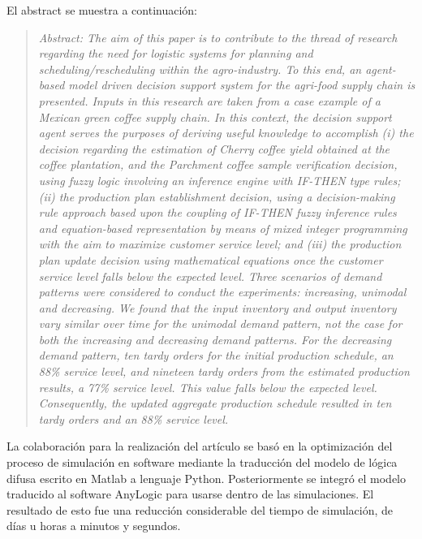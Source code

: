 El abstract se muestra a continuación:

\begin{quotation}
\emph{Abstract: The aim of this paper is to contribute to the thread of research
regarding the need for logistic systems for planning and scheduling/rescheduling
within the agro-industry. To this end, an agent-based model driven decision
support system for the agri-food supply chain is presented. Inputs in this
research are taken from a case example of a Mexican green coffee supply chain.
In this context, the decision support agent serves the purposes of deriving
useful knowledge to accomplish (i) the decision regarding the estimation of
Cherry coffee yield obtained at the coffee plantation, and the Parchment coffee
sample verification decision, using fuzzy logic involving an inference engine
with IF-THEN type rules; (ii) the production plan establishment decision, using
a decision-making rule approach based upon the coupling of IF-THEN fuzzy
inference rules and equation-based representation by means of mixed integer
programming with the aim to maximize customer service level; and (iii) the
production plan update decision using mathematical equations once the customer
service level falls below the expected level. Three scenarios of demand patterns
were considered to conduct the experiments: increasing, unimodal and decreasing.
We found that the input inventory and output inventory vary similar over time
for the unimodal demand pattern, not the case for both the increasing and
decreasing demand patterns. For the decreasing demand pattern, ten tardy orders
for the initial production schedule, an 88\% service level, and nineteen tardy
orders from the estimated production results, a 77\% service level. This value
falls below the expected level. Consequently, the updated aggregate production
schedule resulted in ten tardy orders and an 88\% service level.}
\end{quotation}

La colaboración para la realización del artículo se basó en la optimización del
proceso de simulación en software mediante la traducción del modelo de lógica
difusa escrito en Matlab a lenguaje Python. Posteriormente se integró el modelo
traducido al software AnyLogic para usarse dentro de las
simulaciones. El resultado de esto fue una reducción considerable del tiempo de
simulación, de días u horas a minutos y segundos.